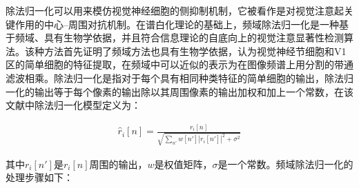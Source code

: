 除法归一化\cite{BianCognNeurodyn2010Visual}可以用来模仿视觉神经细胞的侧抑制机制，它被看作是对视觉注意起关键作用的中心--周围对抗机制。在谱白化理论\cite{Bian2009Biological}的基础上，频域除法归一化是一种基于频域、具有生物学依据，并且符合信息理论的自底向上的视觉注意显著性检测算法。该种方法首先证明了频域方法也具有生物学依据，认为视觉神经节细胞和V1区的简单细胞的特征提取，在频域中可以近似的表示为在图像频谱上用分割的带通滤波相乘。除法归一化是指对于每个具有相同种类特征的简单细胞的输出，除法归一化的输出等于每个像素的输出除以其周围像素的输出加权和加上一个常数，在该文献中除法归一化模型定义为：
\begin{linenomath}
\begin{align}
\hat{r}_{i}[n]=\frac{r_{i}[n]}{\sqrt{\sum_{n'}w[n']|r_{i}[n']|^{2}+\sigma^{2}}}
\label{式3_14}
\end{align}
\end{linenomath}
其中$r_{i}[n']$是$r_{i}[n]$周围的输出，$w$是权值矩阵，$\sigma$是一个常数。频域除法归一化的处理步骤如下：
